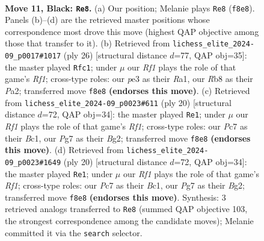 \documentclass[11pt]{article}
\begin{document}
\begin{figure}[p]
\label{fig:thought-m19}
\end{figure}

\clearpage

\begin{figure}[p]\centering
\begin{subfigure}{0.46\textwidth}\centering
\resizebox{\linewidth}{!}{%
\newchessgame
\chessboard[
  setfen={1rb2rk1/p1p1qppp/2n1pn2/1pPp4/3P4/2B1PNP1/PP3P1P/R2QKB1R b Q - 1 11},
  showmover=false,
  pgfstyle=straightmove, color=movearrow, markmove={f8-e8}
]}
\caption{}
\end{subfigure}\hfill
\begin{subfigure}{0.46\textwidth}\centering
\resizebox{\linewidth}{!}{%
\newchessgame
\chessboard[
  setfen={r4rk1/2q2ppp/n1pbpn2/p2p4/N2P4/4PN2/PP1BQPPP/R4RK1 w - - 2 14},
  showmover=false,
  pgfstyle=straightmove, color=movearrow, markmove={f1-c1}
]}
\caption{}
\end{subfigure}
\\[4pt]
\begin{subfigure}{0.46\textwidth}\centering
\resizebox{\linewidth}{!}{%
\newchessgame
\chessboard[
  setfen={rnbqr1k1/1p3pbp/p2p1np1/2pP4/P7/2N2NP1/1P2PPBP/R1BQ1RK1 w - - 1 11},
  showmover=false,
  pgfstyle=straightmove, color=movearrow, markmove={f1-e1}
]}
\caption{}
\end{subfigure}\hfill
\begin{subfigure}{0.46\textwidth}\centering
\resizebox{\linewidth}{!}{%
\newchessgame
\chessboard[
  setfen={rnbqr1k1/1p3pbp/p2p1np1/2pP4/P7/2N2NP1/1P2PPBP/R1BQ1RK1 w - - 1 11},
  showmover=false,
  pgfstyle=straightmove, color=movearrow, markmove={f1-e1}
]}
\caption{}
\end{subfigure}
\caption{\textbf{Move 11, Black: \texttt{Re8}.} (a) Our position; Melanie plays \texttt{Re8} (\texttt{f8e8}). Panels (b)--(d) are the retrieved master positions whose correspondence most drove this move (highest QAP objective among those that transfer to it). (b) Retrieved from \texttt{lichess\_elite\_2024-09\_p0017\#1017} (ply 26) [structural distance $d$=77, QAP obj=35]: the master played \texttt{Rfc1}; under $\mu$ our \emph{Rf1} plays the role of that game's \emph{Rf1}; cross-type roles: our \emph{p}e3 as their \emph{R}a1, our \emph{R}b8 as their \emph{P}a2; transferred move \texttt{f8e8} \textbf{(endorses this move)}. (c) Retrieved from \texttt{lichess\_elite\_2024-09\_p0023\#611} (ply 20) [structural distance $d$=72, QAP obj=34]: the master played \texttt{Re1}; under $\mu$ our \emph{Rf1} plays the role of that game's \emph{Rf1}; cross-type roles: our \emph{P}c7 as their \emph{B}c1, our \emph{P}g7 as their \emph{B}g2; transferred move \texttt{f8e8} \textbf{(endorses this move)}. (d) Retrieved from \texttt{lichess\_elite\_2024-09\_p0023\#1649} (ply 20) [structural distance $d$=72, QAP obj=34]: the master played \texttt{Re1}; under $\mu$ our \emph{Rf1} plays the role of that game's \emph{Rf1}; cross-type roles: our \emph{P}c7 as their \emph{B}c1, our \emph{P}g7 as their \emph{B}g2; transferred move \texttt{f8e8} \textbf{(endorses this move)}. Synthesis: 3 retrieved analogs transferred to \texttt{Re8} (summed QAP objective 103, the strongest correspondence among the candidate moves); Melanie committed it via the \texttt{search} selector.}

\end{figure}
\end{document}
